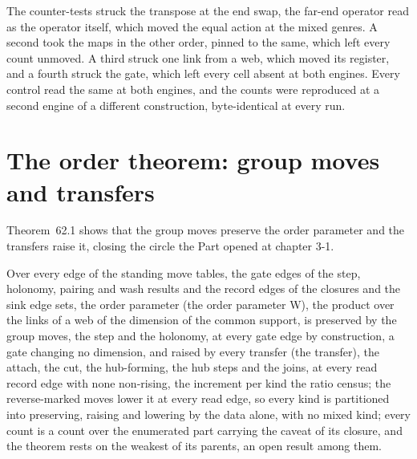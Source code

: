 \begin{chproof}[census]
The counter-tests struck the transpose at the end swap, the far-end operator read as the operator itself, which moved the equal action at the mixed genres. A second took the maps in the other order, pinned to the same, which left every count unmoved. A third struck one link from a web, which moved its register, and a fourth struck the gate, which left every cell absent at both engines. Every control read the same at both engines, and the counts were reproduced at a second engine of a different construction, byte-identical at every run.
\end{chproof}
\par\medskip{}\label{narr:close:3-6}\par
\section{The order theorem: group moves and transfers}\label{mod:III-7-order-theorem-group-moves-and-transfers}
\label{narr:open:3-7}Theorem~62.1 shows that the group moves preserve the order parameter and the transfers raise it, closing the circle the Part opened at chapter 3-1.
\begin{chtheorem}\label{box:III-7-order-theorem-group-moves-and-transfers:1}
Over every edge of the standing move tables, the gate edges of the step, holonomy, pairing and wash results and the record edges of the closures and the sink edge sets, the order parameter (the order parameter W), the product over the links of a web of the dimension of the common support, is preserved by the group moves, the step and the holonomy, at every gate edge by construction, a gate changing no dimension, and raised by every transfer (the transfer), the attach, the cut, the hub-forming, the hub steps and the joins, at every read record edge with none non-rising, the increment per kind the ratio census; the reverse-marked moves lower it at every read edge, so every kind is partitioned into preserving, raising and lowering by the data alone, with no mixed kind; every count is a count over the enumerated part carrying the caveat of its closure, and the theorem rests on the weakest of its parents, an open result among them.
\end{chtheorem}
